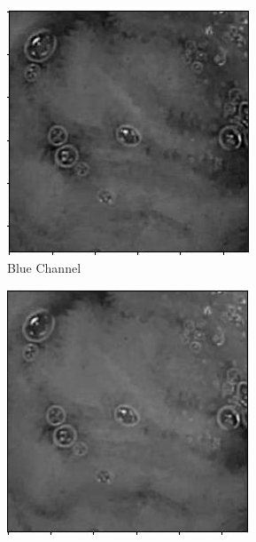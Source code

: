 \begin{figure}[H]
    \centering

      \begin{subfigure}[b]{0.3\textwidth}
    \includegraphics[width=\textwidth]{Chapter6/Blue_9.png}
    \caption{Blue Channel}
  \end{subfigure}
  \begin{subfigure}[b]{0.3\textwidth}
    \includegraphics[width=\textwidth]{Chapter6/Green_9.png}

\end{subfigure}
\end{figure}
